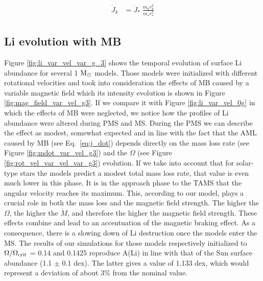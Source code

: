 \documentclass[fleqn,usenatbib]{mnras}
\begin{document}
\begin{ceqn}
\begin{align}
    \Dot{J}_{k} &= \Dot{J}_*\;\frac{m^{}_{k} r^2_{k}}{m^{}_* r_*^2} \label{eq:k_jdot}
\end{align}
\end{ceqn}

\subsection{Li evolution with MB}
Figure \ref{fig:li_var_vel_var_g_3} shows the temporal evolution of surface Li abundance for several 1 $\mathrm{M}_\odot$ models. Those models were initialized with different rotational velocities and took into consideration the effects of MB caused by a variable magnetic field which its intensity evolution is shown in Figure \ref{fig:mag_field_var_vel_g3}. If we compare it with Figure \ref{fig:li_var_vel_0g} in which the effects of MB were neglected, we notice how the profiles of Li abundance were altered during PMS and MS. During the PMS we can describe the effect as modest, somewhat expected and in line with the fact that the AML caused by MB (see Eq.~\ref{eq:j_dot}) depends directly on the mass loss rate (see Figure \ref{fig:mdot_var_vel_g3}) and the $\Omega$ (see Figure \ref{fig:rot_vel_var_vel_var_g3}) evolution. If we take into account that for solar-type stars the models predict a modest total mass loss rate, that value is even much lower in this phase. It is in the approach phase to the TAMS that the angular velocity reaches its maximum. This, according to our model, plays a crucial role in both the mass loss and the magnetic field strength. The higher the $\Omega$, the higher the $\Dot{M}$, and therefore the higher the magnetic field strength. These effects combine and lead to an accentuation of the magnetic braking effect. As a consequence, there is a slowing down of Li destruction once the models enter the MS. The results of our simulations for those models respectively initialized to $\Omega / \Omega_{\mathrm{crit}}$ = 0.14 and 0.1425 reproduce A(Li) in line with that of the Sun surface  abundance  (1.1 $\pm$ 0.1 dex). The latter gives a value of 1.133 dex, which would represent a deviation of about 3\% from the nominal value.\par
\end{document}
